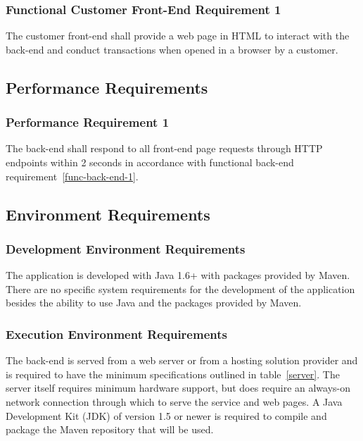 \documentclass{article}
\begin{document}


\subsubsection{Functional Customer Front-End Requirement 1}
\label{func-cust-front-end-1}

The customer front-end shall provide a web page in HTML to interact with the
back-end and conduct transactions when opened in a browser by a customer.

\subsection{Performance Requirements}

\subsubsection{Performance Requirement 1}
\label{perf-back-end-1}

The back-end shall respond to all front-end page requests through HTTP endpoints
within 2 seconds in accordance with functional back-end
requirement~\ref{func-back-end-1}.

\subsection{Environment Requirements}
\subsubsection{Development Environment Requirements}

The application is developed with Java 1.6+ with packages provided by 
Maven.  There are no specific system requirements for the development of
the application besides the ability to use Java and the packages provided
by Maven.

\subsubsection{Execution Environment Requirements}

The back-end is served from a web server or from a hosting solution provider and is
required to have the minimum specifications outlined in table~\ref{server}.  The
server itself requires minimum hardware support, but does require an always-on
network connection through which to serve the service and web pages.  A Java
Development Kit (JDK) of version 1.5 or newer is required to compile and package
the Maven repository that will be used.
\end{document}
